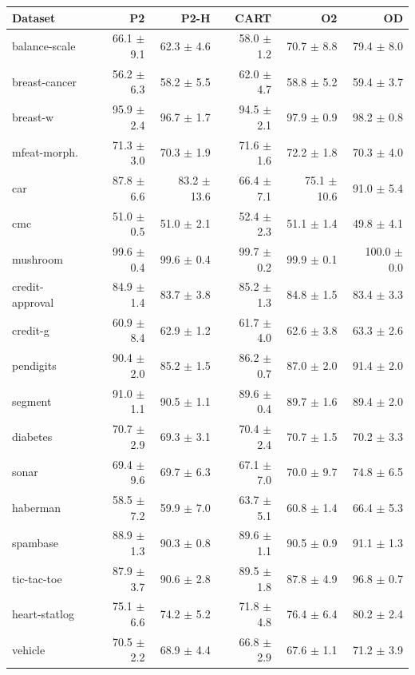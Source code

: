\begin{tabular}{lrrrrr}
\toprule
Dataset & P2 & P2-H & CART & O2 & OD \\
\midrule
balance-scale & 66.1 $\pm$ 9.1 & 62.3 $\pm$ 4.6 & 58.0 $\pm$ 1.2 & 70.7 $\pm$ 8.8 & 79.4 $\pm$ 8.0 \\
breast-cancer & 56.2 $\pm$ 6.3 & 58.2 $\pm$ 5.5 & 62.0 $\pm$ 4.7 & 58.8 $\pm$ 5.2 & 59.4 $\pm$ 3.7 \\
breast-w & 95.9 $\pm$ 2.4 & 96.7 $\pm$ 1.7 & 94.5 $\pm$ 2.1 & 97.9 $\pm$ 0.9 & 98.2 $\pm$ 0.8 \\
mfeat-morph. & 71.3 $\pm$ 3.0 & 70.3 $\pm$ 1.9 & 71.6 $\pm$ 1.6 & 72.2 $\pm$ 1.8 & 70.3 $\pm$ 4.0 \\
car & 87.8 $\pm$ 6.6 & 83.2 $\pm$ 13.6 & 66.4 $\pm$ 7.1 & 75.1 $\pm$ 10.6 & 91.0 $\pm$ 5.4 \\
cmc & 51.0 $\pm$ 0.5 & 51.0 $\pm$ 2.1 & 52.4 $\pm$ 2.3 & 51.1 $\pm$ 1.4 & 49.8 $\pm$ 4.1 \\
mushroom & 99.6 $\pm$ 0.4 & 99.6 $\pm$ 0.4 & 99.7 $\pm$ 0.2 & 99.9 $\pm$ 0.1 & 100.0 $\pm$ 0.0 \\
credit-approval & 84.9 $\pm$ 1.4 & 83.7 $\pm$ 3.8 & 85.2 $\pm$ 1.3 & 84.8 $\pm$ 1.5 & 83.4 $\pm$ 3.3 \\
credit-g & 60.9 $\pm$ 8.4 & 62.9 $\pm$ 1.2 & 61.7 $\pm$ 4.0 & 62.6 $\pm$ 3.8 & 63.3 $\pm$ 2.6 \\
pendigits & 90.4 $\pm$ 2.0 & 85.2 $\pm$ 1.5 & 86.2 $\pm$ 0.7 & 87.0 $\pm$ 2.0 & 91.4 $\pm$ 2.0 \\
segment & 91.0 $\pm$ 1.1 & 90.5 $\pm$ 1.1 & 89.6 $\pm$ 0.4 & 89.7 $\pm$ 1.6 & 89.4 $\pm$ 2.0 \\
diabetes & 70.7 $\pm$ 2.9 & 69.3 $\pm$ 3.1 & 70.4 $\pm$ 2.4 & 70.7 $\pm$ 1.5 & 70.2 $\pm$ 3.3 \\
sonar & 69.4 $\pm$ 9.6 & 69.7 $\pm$ 6.3 & 67.1 $\pm$ 7.0 & 70.0 $\pm$ 9.7 & 74.8 $\pm$ 6.5 \\
haberman & 58.5 $\pm$ 7.2 & 59.9 $\pm$ 7.0 & 63.7 $\pm$ 5.1 & 60.8 $\pm$ 1.4 & 66.4 $\pm$ 5.3 \\
spambase & 88.9 $\pm$ 1.3 & 90.3 $\pm$ 0.8 & 89.6 $\pm$ 1.1 & 90.5 $\pm$ 0.9 & 91.1 $\pm$ 1.3 \\
tic-tac-toe & 87.9 $\pm$ 3.7 & 90.6 $\pm$ 2.8 & 89.5 $\pm$ 1.8 & 87.8 $\pm$ 4.9 & 96.8 $\pm$ 0.7 \\
heart-statlog & 75.1 $\pm$ 6.6 & 74.2 $\pm$ 5.2 & 71.8 $\pm$ 4.8 & 76.4 $\pm$ 6.4 & 80.2 $\pm$ 2.4 \\
vehicle & 70.5 $\pm$ 2.2 & 68.9 $\pm$ 4.4 & 66.8 $\pm$ 2.9 & 67.6 $\pm$ 1.1 & 71.2 $\pm$ 3.9 \\
\bottomrule
\end{tabular}
